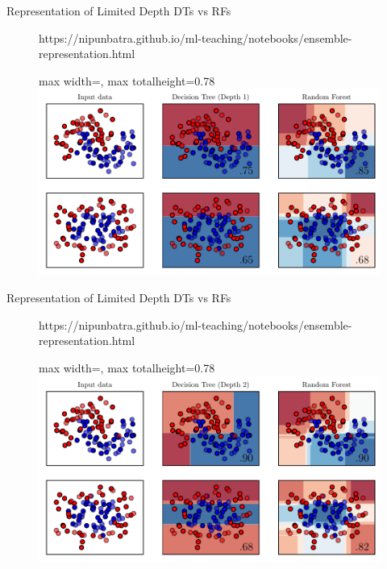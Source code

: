 \documentclass[aspectratio=169,10pt]{beamer}
\newcommand{\fitpic}[1]{\begin{adjustbox}{max width=\linewidth, max totalheight=0.78\textheight}#1\end{adjustbox}}
\begin{document}
\begin{frame}{Representation of Limited Depth DTs vs RFs}
\begin{figure}[htp]
  \centering
  \begin{notebookbox}{https://nipunbatra.github.io/ml-teaching/notebooks/ensemble-representation.html}
    \fitpic{\includegraphics[scale=0.6]{../assets/ensemble/figures/1-representation.pdf}}
  \end{notebookbox}
\end{figure}
\end{frame}

\begin{frame}{Representation of Limited Depth DTs vs RFs}
\begin{figure}[htp]
  \centering
  \begin{notebookbox}{https://nipunbatra.github.io/ml-teaching/notebooks/ensemble-representation.html}
    \fitpic{\includegraphics[scale=0.6]{../assets/ensemble/figures/2-representation.pdf}}
  \end{notebookbox}
\end{figure}
\end{frame}
\end{document}
